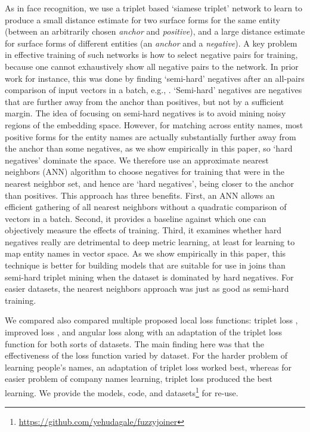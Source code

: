 As in face recognition, we use a triplet based `siamese triplet' network to learn to produce a small distance estimate for two surface forms for the same entity (between an arbitrarily chosen \textit{anchor} and \textit{positive}), and a large distance estimate for surface forms of different entities (an \textit{anchor} and a \textit{negative}).  A key problem in effective training of such networks is how to select negative pairs for training, because one cannot exhaustively show all negative pairs to the network.  In prior work for instance, this was done by finding `semi-hard' negatives after an all-pairs comparison of input vectors in a batch, e.g., \cite{DBLP:conf/cvpr/SchroffKP15}.  `Semi-hard' negatives are negatives that are further away from the anchor than positives, but not by a sufficient margin.  The idea of focusing on semi-hard negatives is to avoid mining noisy regions of the embedding space.  However, for matching across entity names, most positive forms for the entity names are actually substantially further away from the anchor than some negatives, as we show empirically in this paper, so `hard negatives' dominate the space.  We therefore use an approximate nearest neighbors (ANN) algorithm to choose negatives for training that were in the nearest neighbor set, and hence are `hard negatives', being closer to the anchor than positives.  This approach has three benefits.  First, an ANN allows an efficient gathering of all nearest neighbors without a quadratic comparison of vectors in a batch.  Second, it provides a baseline against which one can objectively measure the effects of training.  Third, it examines whether hard negatives really are detrimental to deep metric learning, at least for learning to map entity names in vector space.  As we show empirically in this paper, this technique is better for building models that are suitable for use in joins than semi-hard triplet mining when the dataset is dominated by hard negatives.  For easier datasets, the nearest neighbors approach was just as good as semi-hard training.

We compared also compared multiple proposed local loss functions: triplet loss \cite{DBLP:conf/cvpr/SchroffKP15}, improved loss \cite{Zhang:2016:DML:3088616.3088665}, and angular loss \cite{DBLP:journals/corr/abs-1708-01682} along with an adaptation of the triplet loss function for both sorts of datasets.  The main finding here was that the effectiveness of the loss function varied by dataset.  For the harder problem of learning people's names, an adaptation of triplet loss worked best, whereas for easier problem of company names learning, triplet loss produced the best learning.  We provide the models, code, and datasets\footnote{\url{https://github.com/yehudagale/fuzzyjoiner}} for re-use.

